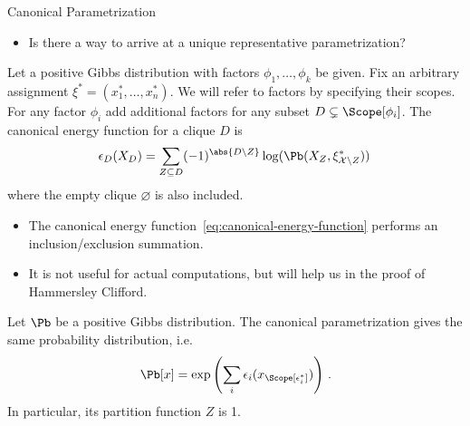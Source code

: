 \begin{frame}{Canonical Parametrization}
    \begin{itemize}
        \item Is there a way to arrive at a unique representative parametrization?
    \end{itemize}
\begin{definition}
    Let a positive Gibbs distribution with factors $\phi_1,\ldots,\phi_k$ be given. 
    Fix an arbitrary assignment $\xi^* = (x_1^*, \ldots, x_n^*)$.
    We will refer to factors by specifying their scopes.
    \pause
    For any factor $\phi_i$ add additional factors for any subset $D \subsetneq \Scope[\phi_i]$.
\pause
    The canonical energy function for a clique $D$ is
    \begin{equation}
        \label{eq:canonical-energy-function}
        \epsilon_D(X_D) = \sum_{Z \subseteq D} (-1)^{\abs{D \backslash Z}} \log(\Pb(X_Z, \xi^*_{\mathcal{X} \backslash Z}))\,
    \end{equation}
    where the empty clique $\varnothing$ is also included.
\end{definition}
\begin{itemize}
\pause \item The canonical energy function~\eqref{eq:canonical-energy-function} performs an inclusion/exclusion summation.
\pause \item It is not useful for actual computations, but will help us in the proof of Hammersley Clifford.
\end{itemize}
\pause
\begin{theorem}
    Let $\Pb$ be a positive Gibbs distribution. The canonical parametrization gives the same probability distribution, i.e.\ 
    \begin{equation}
        \label{eq:canonical-parametrization}
        \Pb[x] = \exp\left(\sum_{i} \epsilon_{i}(x_{\Scope[\epsilon^*_i]})\right)\,.
    \end{equation}
    In particular, its partition function $Z$ is 1.
\end{theorem}
\end{frame}

